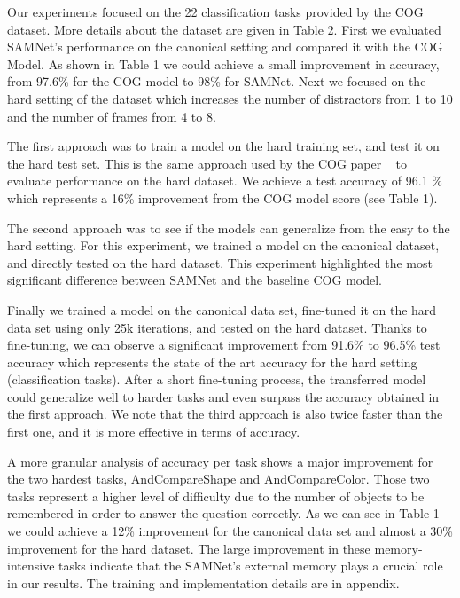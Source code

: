 Our experiments focused on the 22 classification tasks provided by the COG dataset. More details about the dataset are given in Table 2. First we evaluated SAMNet's performance on the canonical setting and compared it with the COG Model. As shown in Table 1 we could achieve a small improvement in accuracy, from 97.6\% for the COG model to 98\% for SAMNet. Next we focused on the hard setting of the dataset which increases the number of distractors from 1 to 10 and the number of frames from 4 to 8.

The first approach was to train a model on the hard training set, and test it on the hard test set. This is the same approach used by the COG paper ~\cite{yang2018dataset} to evaluate performance on the hard dataset. We achieve a test accuracy of 96.1 \% which represents a 16\% improvement from the COG model score (see Table 1).

The second approach was to see if the models can generalize from the easy to the hard setting. For this experiment, we trained a model on the canonical dataset, and directly tested on the hard dataset.  This experiment highlighted the most significant difference between SAMNet and the baseline COG model.

Finally we trained a model on the canonical data set, fine-tuned it on the hard data set using only 25k iterations, and tested on the hard dataset. Thanks to fine-tuning, we can observe a significant improvement from 91.6\%  to 96.5\% test accuracy which represents the state of the art accuracy for the hard setting (classification tasks).
After a short fine-tuning process, the transferred model could generalize well to harder tasks and even surpass the accuracy obtained in the first approach. We note that the third approach is also twice faster than the first one, and it is more effective in terms of accuracy.

A more granular analysis of accuracy per task shows a major improvement for the two hardest tasks, AndCompareShape and AndCompareColor. Those two tasks represent a higher level of difficulty due to the number of objects to be remembered in order to answer the question correctly.
As we can see in Table 1 we could achieve a 12\% improvement for the canonical data set and almost a 30\% improvement for the hard dataset.
The large improvement in these memory-intensive tasks indicate that the SAMNet's external memory plays a crucial role in our results. 
The training and implementation details are in appendix.

